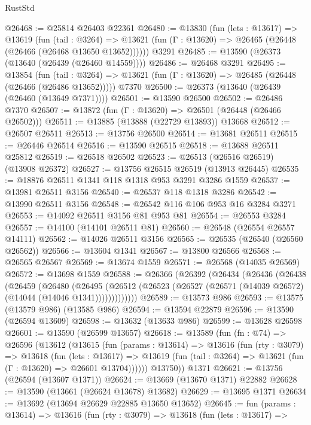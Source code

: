 \begin{lexlean}{RustStd}
\begin{coremodule}
@26468 := @25814 @26403 @22361
@26480 := @13830
    (fun (lets : @13617) =>
    @13619
      (fun (tail : @3264) =>
      @13621 (fun (Γ : @13620) => @26465 (@26448 (@26466 (@26468 @13650 @13652))))))
    @3291
@26485 := @13590 (@26373 (@13640 (@26439 (@26460 @14559))))
@26486 := @26468 @3291
@26495 := @13854
    (fun (tail : @3264) => @13621 (fun (Γ : @13620) => @26485 (@26448 (@26466 (@26486 @13652)))))
    @7370
@26500 := @26373 (@13640 (@26439 (@26460 (@13649 @7371))))
@26501 := @13590 @26500
@26502 := @26486 @7370
@26507 := @13872 (fun (Γ : @13620) => @26501 (@26448 (@26466 @26502)))
@26511 := @13885 (@13888 (@22729 @13893)) @13668
@26512 := @26507 @26511
@26513 := @13756 @26500
@26514 := @13681 @26511
@26515 := @26446 @26514
@26516 := @13590 @26515
@26518 := @13688 @26511 @25812
@26519 := @26518 @26502
@26523 := @26513 (@26516 @26519) (@13908 @26372)
@26527 := @13756 @26515 @26519 (@13913 @26445)
@26535 := @18876 @26511 @1341 @118 @1318 @953 @3291 @3286 @1559
@26537 := @13981 @26511 @3156
@26540 := @26537 @118 @1318 @3286
@26542 := @13990 @26511 @3156
@26548 := @26542 @116 @106 @953 @16 @3284 @3271
@26553 := @14092 @26511 @3156 @81 @953 @81
@26554 := @26553 @3284
@26557 := @14100 (@14101 @26511 @81)
@26560 := @26548 (@26554 @26557 @14111)
@26562 := @14026 @26511 @3156
@26565 := @26535 (@26540 (@26560 @26562))
@26566 := @13604 @1341
@26567 := @13800 @26566
@26568 := @26565 @26567
@26569 := @13674 @1559
@26571 := @26568 (@14035 @26569)
@26572 := @13698 @1559
@26588 := @26366
    (@26392
      (@26434
        (@26436
          (@26438
            (@26459
              (@26480
                (@26495
                  (@26512 (@26523 (@26527 (@26571 (@14039 @26572) (@14044 (@14046 @1341)))))))))))))
@26589 := @13573 @986
@26593 := @13575 (@13579 @986) (@13585 @986)
@26594 := @13594 @22879
@26596 := @13590 (@26594 @13609)
@26598 := @13632 (@13633 @986)
@26599 := @13628 @26598
@26601 := @13590 (@26599 @13657)
@26618 := @13589
    (fun (fn : @74) =>
    @26596
      (@13612
        (@13615
          (fun (params : @13614) =>
          @13616
            (fun (rty : @3079) =>
            @13618
              (fun (lets : @13617) =>
              @13619 (fun (tail : @3264) => @13621 (fun (Γ : @13620) => @26601 @13704))))))
        @13750))
    @1371
@26621 := @13756 (@26594 (@13607 @1371))
@26624 := @13669 (@13670 @1371) @22882
@26628 := @13590 (@13661 (@26624 @13678) @13682)
@26629 := @13695 @1371
@26634 := @13692 (@13694 @26629 @22885 @13650 @13652)
@26645 := fun (params : @13614) =>
  @13616
    (fun (rty : @3079) =>
    @13618
      (fun (lets : @13617) =>

\end{coremodule}
\end{lexlean}
